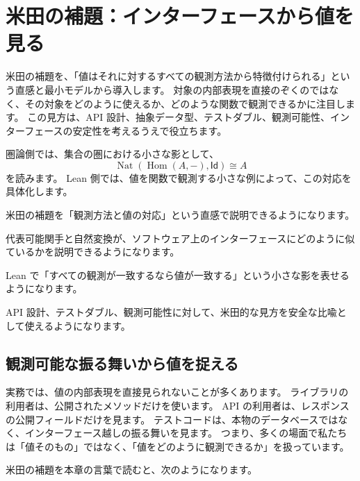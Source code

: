 \chapter{米田の補題：インターフェースから値を見る}
\label{chap:yoneda-interface}

\begin{chapterabstract}
米田の補題を、「値はそれに対するすべての観測方法から特徴付けられる」という直感と最小モデルから導入します。
対象の内部表現を直接のぞくのではなく、その対象をどのように使えるか、どのような関数で観測できるかに注目します。
この見方は、API 設計、抽象データ型、テストダブル、観測可能性、インターフェースの安定性を考えるうえで役立ちます。

圏論側では、集合の圏における小さな影として、
\[
  \operatorname{Nat}(\operatorname{Hom}(A,-), \mathsf{Id}) \cong A
\]
を読みます。
Lean 側では、値を関数で観測する小さな例によって、この対応を具体化します。
\end{chapterabstract}

\begin{learninggoals}
\item 米田の補題を「観測方法と値の対応」という直感で説明できるようになります。
\item 代表可能関手と自然変換が、ソフトウェア上のインターフェースにどのように似ているかを説明できるようになります。
\item Lean で「すべての観測が一致するなら値が一致する」という小さな影を表せるようになります。
\item API 設計、テストダブル、観測可能性に対して、米田的な見方を安全な比喩として使えるようになります。
\end{learninggoals}

\section{観測可能な振る舞いから値を捉える}

実務では、値の内部表現を直接見られないことが多くあります。
ライブラリの利用者は、公開されたメソッドだけを使います。
API の利用者は、レスポンスの公開フィールドだけを見ます。
テストコードは、本物のデータベースではなく、インターフェース越しの振る舞いを見ます。
つまり、多くの場面で私たちは「値そのもの」ではなく、「値をどのように観測できるか」を扱っています。

米田の補題を本章の言葉で読むと、次のようになります。

